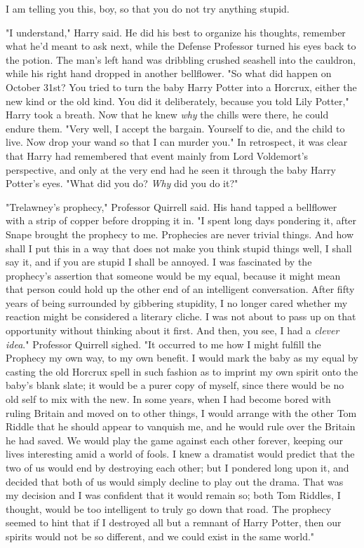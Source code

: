  I am telling you this, boy, so that you do not
try anything stupid.

"I understand," Harry said. He did his best to organize his thoughts, remember
what he'd meant to ask next, while the Defense Professor turned his eyes back
to the potion. The man's left hand was dribbling crushed seashell into the
cauldron, while his right hand dropped in another bellflower. "So what did
happen on October 31st? You{\el} tried to turn the baby Harry Potter into a
Horcrux, either the new kind or the old kind. You did it deliberately, because
you told Lily Potter," Harry took a breath. Now that he knew \emph{why} the
chills were there, he could endure them. "Very well, I accept the bargain.
Yourself to die, and the child to live. Now drop your wand so that I can murder
you." In retrospect, it was clear that Harry had remembered that event mainly
from Lord Voldemort's perspective, and only at the very end had he seen it
through the baby Harry Potter's eyes. "What did you do? \emph{Why} did you do
it?"

"Trelawney's prophecy," Professor Quirrell said. His hand tapped a bellflower
with a strip of copper before dropping it in. "I spent long days pondering it,
after Snape brought the prophecy to me. Prophecies are never trivial things.
And how shall I put this in a way that does not make you think stupid
things{\el} well, I shall say it, and if you are stupid I shall be annoyed.
I was fascinated by the prophecy's assertion that someone would be my equal,
because it might mean that person could hold up the other end of an intelligent
conversation. After fifty years of being surrounded by gibbering stupidity, I
no longer cared whether my reaction might be considered a literary cliche. I
was not about to pass up on that opportunity without thinking about it first.
And then, you see, I had a \emph{clever idea}." Professor Quirrell sighed. "It
occurred to me how I might fulfill the Prophecy my own way, to my own benefit.
I would mark the baby as my equal by casting the old Horcrux spell in such
fashion as to imprint my own spirit onto the baby's blank slate; it would be a
purer copy of myself, since there would be no old self to mix with the new. In
some years, when I had become bored with ruling Britain and moved on to other
things, I would arrange with the other Tom Riddle that he should appear to
vanquish me, and he would rule over the Britain he had saved. We would play the
game against each other forever, keeping our lives interesting amid a world of
fools. I knew a dramatist would predict that the two of us would end by
destroying each other; but I pondered long upon it, and decided that both of us
would simply decline to play out the drama. That was my decision and I was
confident that it would remain so; both Tom Riddles, I thought, would be too
intelligent to truly go down that road. The prophecy seemed to hint that if I
destroyed all but a remnant of Harry Potter, then our spirits would not be so
different, and we could exist in the same world."

